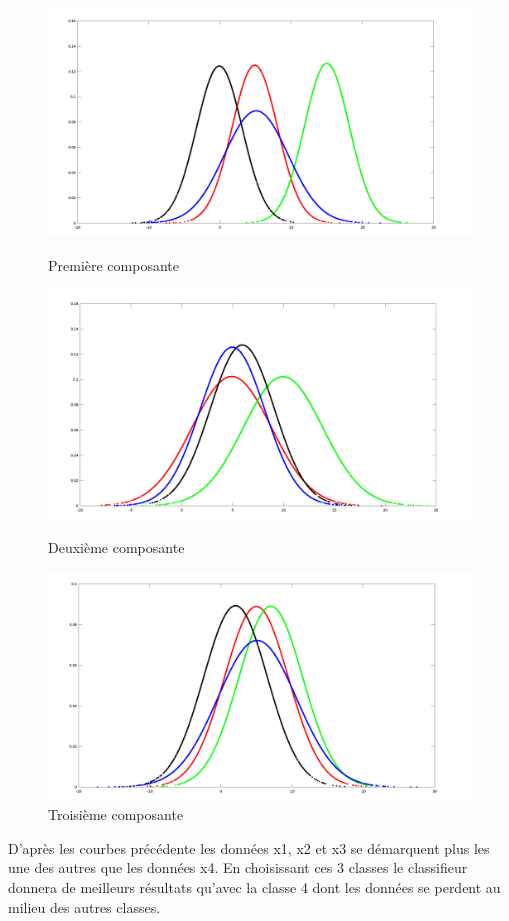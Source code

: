 \documentclass{article}
\begin{document}
\newpage
\begin{figure}[h]
\centerline{\includegraphics[scale=0.24]{donnee1.png}}
\caption{Première composante}

\centerline{\includegraphics[scale=0.24]{donnee2.png}}
\caption{Deuxième composante}

\centerline{\includegraphics[scale=0.24]{donnee3.png}}
\caption{Troisième composante}
\end{figure}


D'après les courbes précédente les données x1, x2 et x3 se démarquent plus les une des autres que les données x4. En choisissant ces 3 classes le classifieur donnera de meilleurs résultats qu'avec la classe 4 dont les données se perdent au milieu des autres classes.
\end{document}
